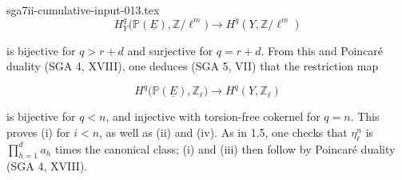 \begin{filecontents*}{sga7ii-cumulative-input-013.tex}
\begin{equation*}
H_Y^q\bigl(\mathbb P(\underline E),\mathbb Z/\ell^m\bigr)
\longrightarrow H^q(Y,\mathbb Z/\ell^m)
\end{equation*}


is bijective for $q>r+d$ and surjective for $q=r+d$.  From this and
Poincaré duality (SGA 4, XVIII), one deduces (SGA 5, VII) that the
restriction map

\begin{equation*}
H^q\bigl(\mathbb P(\underline E),\mathbb Z_\ell\bigr)
\longrightarrow H^q(Y,\mathbb Z_\ell)
\end{equation*}

is bijective for $q<n$, and injective with torsion-free cokernel for $q=n$.
This proves (i) for $i<n$, as well as (ii) and (iv).  As in 1.5, one checks
that $\eta_\ell^n$ is $\prod_{h=1}^d a_h$ times the canonical class; (i)
and (iii) then follow by Poincaré duality (SGA 4, XVIII).

\end{filecontents*}
